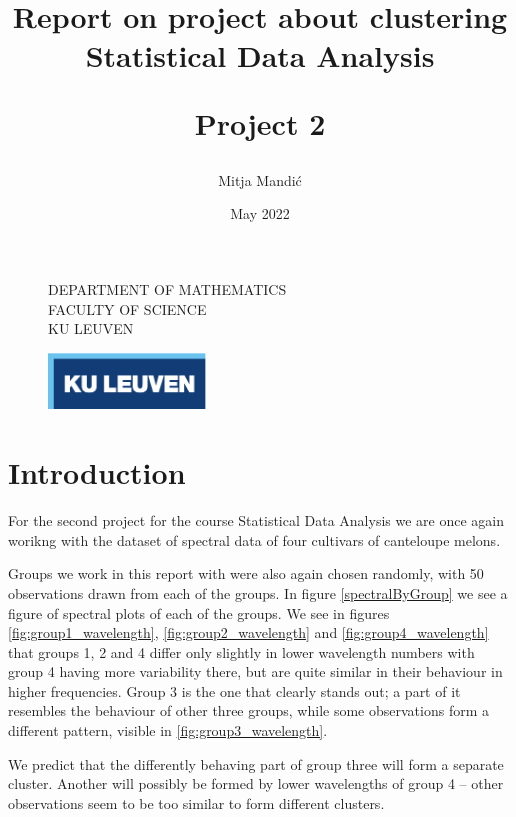 \documentclass[12pt]{article}
\title{\vspace*{40.0mm}
  \bf Report on project about clustering
         \vspace*{20.0mm} \\
  \Large\bf Statistical Data Analysis 
  
 
  
  Project 2 \vspace*{20.0mm}
  \vspace*{40.0mm}}
\author{Mitja Mandić}
\date{ May 2022}
\makeatletter
\def\cleardoublepage{\clearpage\if@twoside \ifodd\c@page\else%
\hbox{}%
\thispagestyle{empty}%
\clearpage%
\if@twocolumn\hbox{}\clearpage\fi\fi\fi}
\makeatother
\begin{document}
\begin{figure}
  \parbox[t]{125mm}{
    \vspace*{6mm}
    \scriptsize\sf           DEPARTMENT OF MATHEMATICS \\
    \scriptsize\sf           FACULTY OF SCIENCE\\
    \scriptsize\sf           KU LEUVEN}
  \parbox[t]{40mm}{
    \begin{flushright}
      \includegraphics[height=15mm]{../images/logo.eps.pdf}
    \end{flushright}}
\end{figure}

\maketitle
\thispagestyle{empty}
\raggedbottom

\cleardoublepage
{}
\setcounter{tocdepth}{2}
{}

\section{Introduction}
For the second project for the course Statistical Data Analysis we are once again worikng with the
dataset of spectral data of four cultivars of canteloupe melons. 

Groups we work in this report with were also again chosen randomly, with 50 observations drawn from each of the groups. In figure \ref{spectralByGroup} we see a figure of 
spectral plots of each of the groups. We see in figures \ref{fig:group1_wavelength}, \ref{fig:group2_wavelength} and \ref{fig:group4_wavelength}
that groups 1, 2 and 4 differ only slightly in lower wavelength numbers with group 4 having more variability there,
but are quite similar in their behaviour in higher frequencies. Group 3 is the one that clearly stands out; 
a part of it resembles the behaviour of other three groups, while some observations form a different pattern, visible in \ref{fig:group3_wavelength}. 

We predict that the differently behaving part of group three will form a 
separate cluster. Another will possibly be formed by lower wavelengths of group 4 -- other observations seem to be too similar to form different clusters.
\end{document}
